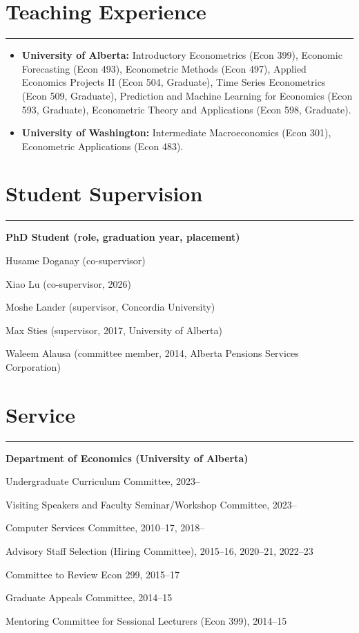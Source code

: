 \documentclass[overlapped,letterpaper,11pt]{res}
\newcommand{\cvrule}{%
  \hspace*{-\sectionwidth}%
  \rule[2mm]{\dimexpr\textwidth+\sectionwidth\relax}{.25pt}}
\newcommand{\cvsection}[1]{%
  \needspace{4\baselineskip}%
  \section{\textbf{#1}}%
  \cvrule}
\newenvironment{list1}{
  \begin{list}{\textendash}{%
      \setlength{\itemsep}{0in}
      \setlength{\parsep}{0in} \setlength{\parskip}{0in}
      \setlength{\topsep}{0in} \setlength{\partopsep}{0in}
      \setlength{\leftmargin}{0.17in}}}{\end{list}
}
\begin{document}
\begin{resume}
\begin{itemize}
\end{itemize}

\cvsection{Teaching Experience}
\begin{itemize}

\item \textbf{University of Alberta:}
Introductory Econometrics (Econ 399), Economic Forecasting (Econ 493),
Econometric Methods (Econ 497),
Applied Economics Projects II (Econ 504, Graduate),
Time Series Econometrics (Econ 509, Graduate),
Prediction and Machine Learning for Economics (Econ 593, Graduate),
Econometric Theory and Applications (Econ 598, Graduate).

\item \textbf{University of Washington:}
Intermediate Macroeconomics (Econ 301), Econometric Applications (Econ 483).

\end{itemize}


\cvsection{Student Supervision}

\begin{itemize}
\item \textbf{PhD Student (role, graduation year, placement)}
	\begin{list1}
		\item[-] Husame Doganay (co-supervisor)
		\item[-] Xiao Lu (co-supervisor, 2026)
		\item[-] Moshe Lander (supervisor, Concordia University)
		\item[-] Max Sties (supervisor, 2017, University of Alberta)
		\item[-] Waleem Alausa (committee member, 2014, Alberta Pensions Services Corporation)
	\end{list1}

\end{itemize}

\cvsection{Service}
\begin{itemize}

\item \textbf{Department of Economics (University of Alberta)}
	\begin{list1}
		\item[-] Undergraduate Curriculum Committee, 2023--
		\item[-] Visiting Speakers and Faculty Seminar/Workshop Committee, 2023--
		\item[-] Computer Services Committee, 2010--17, 2018--
		\item[-] Advisory Staff Selection (Hiring Committee), 2015--16, 2020--21, 2022--23
		\item[-] Committee to Review Econ 299, 2015--17
		\item[-] Graduate Appeals Committee, 2014--15
		\item[-] Mentoring Committee for Sessional Lecturers (Econ 399), 2014--15
	\end{list1}


\end{itemize}
\end{resume}
\end{document}
